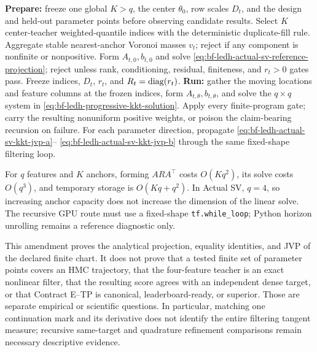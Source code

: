 \begin{algorithm}[H]
\caption{Actual-SV overcomplete analytical chart preparation and runtime}
\label{alg:bf-ledh-actual-sv-overcomplete-chart}
\begin{algorithmic}[1]
  \State \textbf{Prepare:} freeze one global \(K>q\), the center
    \(\theta_0\), row scales \(D_t\), and the design and held-out parameter
    points before observing candidate results.
    \State Select \(K\) center-teacher weighted-quantile indices with the
      deterministic duplicate-fill rule.
    \State Aggregate stable nearest-anchor Voronoi masses \(v_t\); reject if
      any component is nonfinite or nonpositive.
    \State Form \(A_{t,0},b_{t,0}\) and solve
      \eqref{eq:bf-ledh-actual-sv-reference-projection}; reject unless rank,
      conditioning, residual, finiteness, and \(r_t>0\) gates pass.
    \State Freeze indices, \(D_t\), \(r_t\), and \(R_t=\operatorname{diag}(r_t)\).
  \EndFor
  \State \textbf{Run:} gather the moving locations and feature columns at the
    frozen indices, form \(A_{t,\theta},b_{t,\theta}\), and solve the
    \(q\times q\) system in
    \eqref{eq:bf-ledh-progressive-kkt-solution}.
  \State Apply every finite-program gate; carry the resulting nonuniform
    positive weights, or poison the claim-bearing recursion on failure.
  \State For each parameter direction, propagate
    \eqref{eq:bf-ledh-actual-sv-kkt-jvp-a}--
    \eqref{eq:bf-ledh-actual-sv-kkt-jvp-b} through the same fixed-shape
    filtering loop.
\end{algorithmic}
\end{algorithm}

For \(q\) features and \(K\) anchors, forming \(ARA^\top\) costs
\(O(Kq^2)\), its solve costs \(O(q^3)\), and temporary storage is
\(O(Kq+q^2)\).  In Actual SV, \(q=4\), so increasing anchor capacity does not
increase the dimension of the linear solve.  The recursive GPU route must use
a fixed-shape \texttt{tf.while\_loop}; Python horizon unrolling remains a
reference diagnostic only.

This amendment proves the analytical projection, equality identities, and JVP
of the declared finite chart.  It does not prove that a tested finite set of
parameter points covers an HMC trajectory, that the four-feature teacher is an
exact nonlinear filter, that the resulting score agrees with an independent
dense target, or that Contract E--TP is canonical, leaderboard-ready, or
superior.  Those are separate empirical or scientific questions.  In
particular, matching one continuation mark and its derivative does not identify
the entire filtering tangent measure; recursive same-target and quadrature
refinement comparisons remain necessary descriptive evidence.

